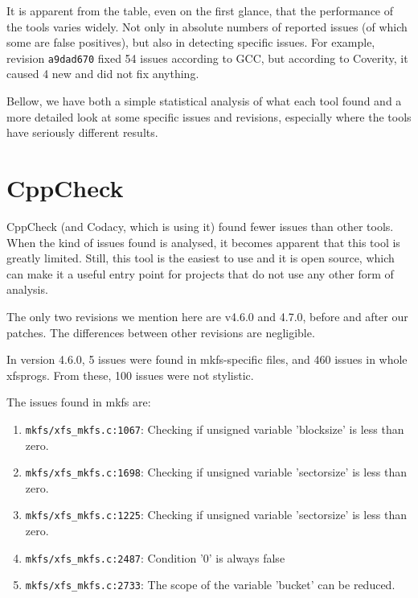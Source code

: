 It is apparent from the table, even on the first glance, that the performance
of the tools varies widely. Not only in absolute numbers of reported issues (of
which some are false positives), but also in detecting specific issues. For
example, revision {\tt a9dad670} fixed 54 issues according to GCC, but
according to Coverity, it caused 4 new and did not fix anything.

Bellow, we have both a simple statistical analysis of what each
tool found and a more detailed look at some specific issues and revisions,
especially where the tools have seriously different results.



\section{CppCheck}\label{chap:results:cppcheck}
CppCheck (and Codacy, which is using it) found fewer issues than other
tools. When the kind of issues found is analysed, it becomes apparent that
this tool is greatly limited. Still, this tool is the easiest to use and it is
open source, which can make it a useful entry point for projects that do not
use any other form of analysis.

The only two revisions we mention here are v4.6.0 and 4.7.0, before and after
our patches. The differences between other revisions are negligible.

In version 4.6.0, 5 issues were found in mkfs-specific
files, and 460 issues in whole xfsprogs. From these, 100 issues were not
stylistic.

The issues found in mkfs are:
\begin{enumerate}
	\item {\tt mkfs/xfs\_mkfs.c:1067}: Checking if unsigned variable
		'blocksize' is less than zero.
	\item {\tt mkfs/xfs\_mkfs.c:1698}: Checking if unsigned variable
		'sectorsize' is less than zero.
	\item {\tt mkfs/xfs\_mkfs.c:1225}: Checking if unsigned variable
		'sectorsize' is less than zero.
	\item {\tt mkfs/xfs\_mkfs.c:2487}: Condition '0' is always false
	\item {\tt mkfs/xfs\_mkfs.c:2733}: The scope of the variable 'bucket'
		can be reduced.
\end{enumerate}

